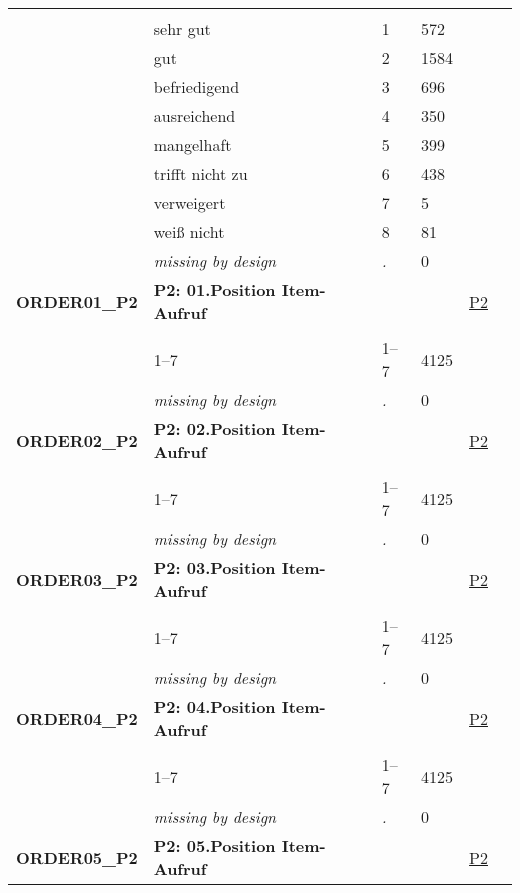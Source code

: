 \begin{longtable}{| L{2.45cm} | L{6cm} | C{1.5cm} | R{1cm} | C{2.25cm} | C{2.25cm} |}
   &  &  &  &  &  \\ 
   & sehr gut & 1 & 572 &  &  \\ 
   & gut & 2 & 1584 &  &  \\ 
   & befriedigend & 3 & 696 &  &  \\ 
   & ausreichend & 4 & 350 &  &  \\ 
   & mangelhaft & 5 & 399 &  &  \\ 
   & trifft nicht zu & 6 & 438 &  &  \\ 
   & verweigert & 7 & 5 &  &  \\ 
   & weiß nicht & 8 & 81 &  &  \\ 
   & \textit{missing by design} & \textit{.} & 0 &  &  \\ 
   \midrule
\textbf{ORDER01\_P2}\label{var:ORDER01:P2} & \textbf{P2: 01.Position Item-Aufruf} &  &  & \hyperref[P2]{P2} & \hyperref[var:suf:]{} \\ 
   &  &  &  &  &  \\ 
   & 1--7 & 1--7 & 4125 &  &  \\ 
   & \textit{missing by design} & \textit{.} & 0 &  &  \\ 
   \midrule
\textbf{ORDER02\_P2}\label{var:ORDER02:P2} & \textbf{P2: 02.Position Item-Aufruf} &  &  & \hyperref[P2]{P2} & \hyperref[var:suf:]{} \\ 
   &  &  &  &  &  \\ 
   & 1--7 & 1--7 & 4125 &  &  \\ 
   & \textit{missing by design} & \textit{.} & 0 &  &  \\ 
   \midrule
\textbf{ORDER03\_P2}\label{var:ORDER03:P2} & \textbf{P2: 03.Position Item-Aufruf} &  &  & \hyperref[P2]{P2} & \hyperref[var:suf:]{} \\ 
   &  &  &  &  &  \\ 
   & 1--7 & 1--7 & 4125 &  &  \\ 
   & \textit{missing by design} & \textit{.} & 0 &  &  \\ 
   \midrule
\textbf{ORDER04\_P2}\label{var:ORDER04:P2} & \textbf{P2: 04.Position Item-Aufruf} &  &  & \hyperref[P2]{P2} & \hyperref[var:suf:]{} \\ 
   &  &  &  &  &  \\ 
   & 1--7 & 1--7 & 4125 &  &  \\ 
   & \textit{missing by design} & \textit{.} & 0 &  &  \\ 
   \midrule
\textbf{ORDER05\_P2}\label{var:ORDER05:P2} & \textbf{P2: 05.Position Item-Aufruf} &  &  & \hyperref[P2]{P2} & \hyperref[var:suf:]{} \\ 

\end{longtable}
